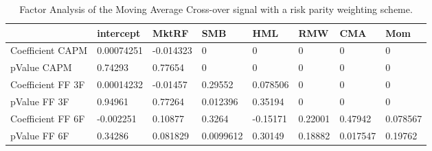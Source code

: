\begin{table}[H]
\centering
\begin{tabular}{llllllll}
& intercept & MktRF & SMB & HML & RMW & CMA & Mom \\ 
\hline 
Coefficient CAPM & 0.00074251 & -0.014323 & 0 & 0 & 0 & 0 & 0 \\ 
pValue CAPM & 0.74293 & 0.77654 & 0 & 0 & 0 & 0 & 0 \\ 
Coefficient FF 3F & 0.00014232 & -0.01457 & 0.29552 & 0.078506 & 0 & 0 & 0 \\ 
pValue FF 3F & 0.94961 & 0.77264 & 0.012396 & 0.35194 & 0 & 0 & 0 \\ 
Coefficient FF 6F & -0.002251 & 0.10877 & 0.3264 & -0.15171 & 0.22001 & 0.47942 & 0.078567 \\ 
pValue FF 6F & 0.34286 & 0.081829 & 0.0099612 & 0.30149 & 0.18882 & 0.017547 & 0.19762 \\ 
\hline
\end{tabular}
\caption{Factor Analysis of the Moving Average Cross-over signal with a risk parity weighting scheme.}
\label{MARP_FACTOR}
\end{table}
